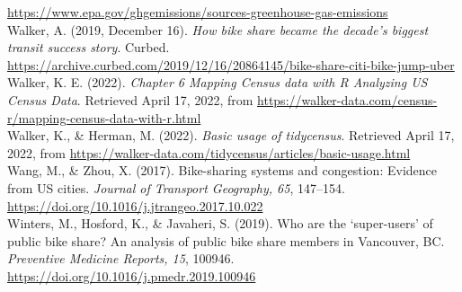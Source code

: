 \documentclass[
  12pt,
]{article}
\begin{document}
\url{https://www.epa.gov/ghgemissions/sources-greenhouse-gas-emissions}\\
Walker, A. (2019, December 16). \emph{How bike share became the decade's
biggest transit success story}. Curbed.
\url{https://archive.curbed.com/2019/12/16/20864145/bike-share-citi-bike-jump-uber}\\
Walker, K. E. (2022). \emph{Chapter 6 Mapping Census data with R
\textbar{} Analyzing US Census Data}. Retrieved April 17, 2022, from
\url{https://walker-data.com/census-r/mapping-census-data-with-r.html}\\
Walker, K., \& Herman, M. (2022). \emph{Basic usage of tidycensus}.
Retrieved April 17, 2022, from
\url{https://walker-data.com/tidycensus/articles/basic-usage.html}\\
Wang, M., \& Zhou, X. (2017). Bike-sharing systems and congestion:
Evidence from US cities. \emph{Journal of Transport Geography, 65},
147--154. \url{https://doi.org/10.1016/j.jtrangeo.2017.10.022}\\
Winters, M., Hosford, K., \& Javaheri, S. (2019). Who are the
`super-users' of public bike share? An analysis of public bike share
members in Vancouver, BC. \emph{Preventive Medicine Reports, 15},
100946. \url{https://doi.org/10.1016/j.pmedr.2019.100946}
\end{document}
